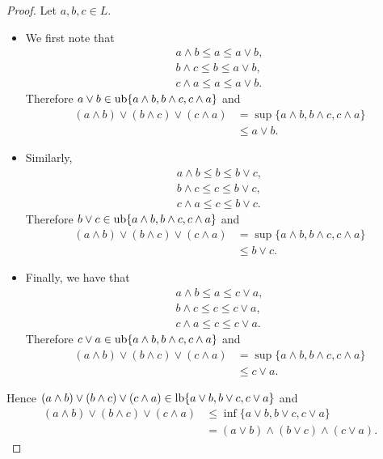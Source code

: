 \documentclass{book}
\begin{document}
	\begin{proof}
		Let $a,b,c \in L$.
		\begin{itemize}
			\item We first note that
			\begin{align*}
				a \wedge b \leq a \leq a \vee b, \\
				b \wedge c \leq b \leq a \vee b, \\
				c \wedge a \leq a \leq a \vee b.
			\end{align*}
			Therefore $a \vee b \in \operatorname{ub} \{a \wedge b, b \wedge c, c \wedge a\}$ and
			\begin{align*}
				(a \wedge b) \vee (b \wedge c) \vee (c \wedge a)
				& = \sup \{a \wedge b, b \wedge c, c \wedge a\} \\
				& \leq a \vee b.
			\end{align*}
			\item Similarly, 
			\begin{align*}
				a \wedge b \leq b \leq b \vee c, \\
				b \wedge c \leq c \leq b \vee c, \\
				c \wedge a \leq c \leq b \vee c.
			\end{align*}
			Therefore $b \vee c \in \operatorname{ub} \{a \wedge b, b \wedge c, c \wedge a\}$ and
			\begin{align*}
				(a \wedge b) \vee (b \wedge c) \vee (c \wedge a)
				& = \sup \{a \wedge b, b \wedge c, c \wedge a\} \\
				& \leq b \vee c.
			\end{align*}
			\item Finally, we have that
			\begin{align*}
				a \wedge b \leq a \leq c \vee a, \\
				b \wedge c \leq c \leq c \vee a, \\
				c \wedge a \leq c \leq c \vee a.
			\end{align*}
			Therefore $c \vee a \in \operatorname{ub} \{a \wedge b, b \wedge c, c \wedge a\}$ and
			\begin{align*}
				(a \wedge b) \vee (b \wedge c) \vee (c \wedge a)
				& = \sup \{a \wedge b, b \wedge c, c \wedge a\} \\
				& \leq c \vee a.
			\end{align*}
		\end{itemize}
		Hence $(a \wedge b) \vee (b \wedge c) \vee (c \wedge a) \in \operatorname{lb} \{a \vee b, b \vee c, c \vee a\}$ and 
		\begin{align*}
			(a \wedge b) \vee (b \wedge c) \vee (c \wedge a)
			& \leq \inf \{a \vee b, b \vee c, c \vee a\} \\
			& = (a \vee b) \wedge (b \vee c) \wedge (c \vee a).
		\end{align*}
	\end{proof}
	
\end{document}
